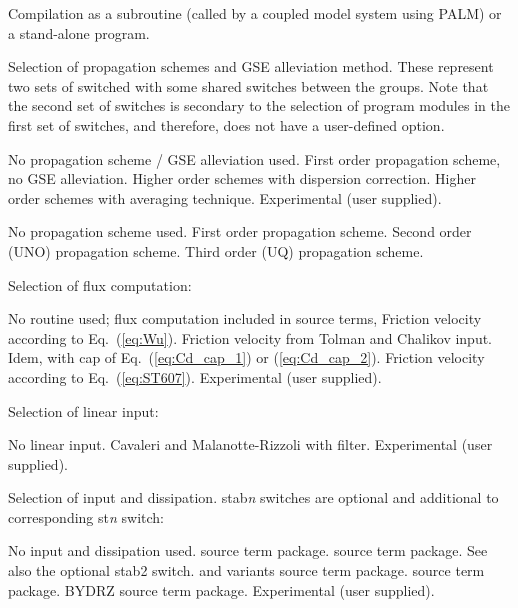 \noindent
Compilation as a subroutine (called by a coupled model system using PALM) or a
stand-alone program.
\begin{slist}
\end{slist}

\noindent
Selection of propagation schemes and GSE alleviation method. These represent
two sets of switched with some shared switches between the groups. Note that
the second set of switches is secondary to the selection of program modules
in the first set of switches, and therefore, does not have a user-defined
option.
\begin{slist}
 {No propagation scheme / GSE alleviation used.}
 {First order propagation scheme, no GSE alleviation.}
 {Higher order schemes with \cite{art:BH87} dispersion correction.}
 {Higher order schemes with \cite{tol:OMOD02b} averaging technique.}
 {Experimental (user supplied).}
\end{slist}

\begin{slist}
 {No propagation scheme used.}
 {First order propagation scheme.}
 {Second order (UNO) propagation scheme.}
 {Third order (UQ) propagation scheme.}
\end{slist}

\noindent
Selection of flux computation:
\begin{slist}
 {No routine used; flux computation included in source terms,}
 {Friction velocity according to Eq.~(\ref{eq:Wu}).}
 {Friction velocity from Tolman and Chalikov input.}
 {Idem, with cap of Eq.~(\ref{eq:Cd_cap_1}) or (\ref{eq:Cd_cap_2}).}
 {Friction velocity according to Eq.~(\ref{eq:ST607}).}
 {Experimental (user supplied).}
\end{slist}

\noindent
Selection of linear input:
\begin{slist}
 {No linear input.}
 {Cavaleri and Malanotte-Rizzoli with filter.}
 {Experimental (user supplied).}
\end{slist}

\noindent
Selection of input and dissipation. {\F stab{}\it n} switches are optional and
additional to corresponding {\F st{\it n}} switch:
\begin{slist}
 {No input and dissipation used.}
 {\wam{} source term package.}
 {\cite{tol:JPO96} source term package. See also the optional 
          {\F stab2} switch.}
 {\wam{} and variants source term package.}
 {\cite{art:Aea10} source term package.}
 {BYDRZ source term package.}
 {Experimental (user supplied).}
\end{slist}

